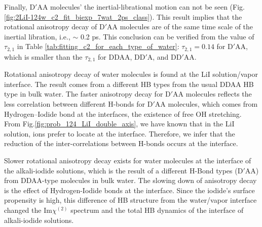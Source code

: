 Finally, D$'$AA molecules' the inertial-librational motion can not be seen (Fig.\thinspace\ref{fig:2LiI-124w_c2_fit_biexp_7wat_2ps_class}). 
This result implies that the rotational anisotropy decay of D$'$AA molecules
are of the same time scale of the inertial libration, i.e., $\sim$ 0.2 ps. 
This conclusion can be verified from the value of $\tau_{2,1}$ in Table \ref{tab:fitting_c2_for_each_type_of_water}: $\tau_{2,1}=0.14$ for D$'$AA, 
which is smaller than the $\tau_{2,1}$ for DDAA, DD$'$A, and DD$'$AA.

Rotational anisotropy decay of water molecules is found at the LiI solution/vapor interface. 
The result comes from a different HB types from the usual DDAA HB type in bulk water.
The faster anisotropy decay for D$'$AA molecules reflects the less correlation between different H-bonds for D$'$AA molecules, 
which comes from Hydrogen--Iodide bond at the interfaces, the existence of free OH stretching.
From Fig.\space\ref{fig:prob_124_LiI_double_axis}, we have known that in the LiI solution, 
\I ions prefer to locate at the interface.  
Therefore, we infer that the reduction of the inter-correlations between H-bonds occurs at the interface. 

Slower rotational anisotropy decay exists for water molecules  at the interface of the alkali-iodide solutions, 
which is the result of a different H-Bond types (D$'$AA) from DDAA-type molecules in bulk water. 
The slowing down of anisotropy decay is the effect of Hydrogen-Iodide bonds at the interface. 
Since the iodide's surface propensity is high, this difference of HB structure from the water/vapor interface changed 
the Im$\chi^{(2)}$ spectrum and the total HB dynamics of the interface of alkali-iodide solutions.  



